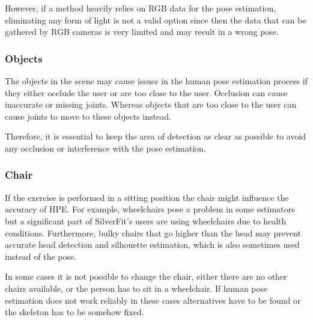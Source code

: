 However, if a method heavily relies on RGB data for the pose estimation, eliminating any form of light is not a valid option since then the data that can be gathered by RGB cameras is very limited and may result in a wrong pose.

\subsubsection{Objects}

The objects in the scene may cause issues in the human pose estimation process if they either occlude the user or are too close to the user. Occlusion can cause inaccurate or missing joints. Whereas objects that are too close to the user can cause joints to move to these objects instead.

Therefore, it is essential to keep the area of detection as clear as possible to avoid any occlusion or interference with the pose estimation.

\subsubsection{Chair}

If the exercise is performed in a sitting position the chair might influence the accuracy of HPE. For example, wheelchairs pose a problem in some estimators but a significant part of SilverFit's users are using wheelchairs due to health conditions. Furthermore, bulky chairs that go higher than the head may prevent accurate head detection and silhouette estimation, which is also sometimes used instead of the pose.

In some cases it is not possible to change the chair, either there are no other chairs available, or the person has to sit in a wheelchair. If human pose estimation does not work reliably in these cases alternatives have to be found or the skeleton has to be somehow fixed.